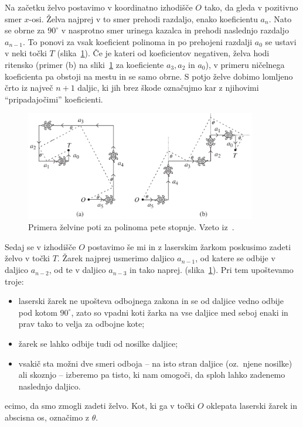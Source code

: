 Na začetku želvo postavimo v koordinatno izhodišče $O$ tako, da gleda v pozitivno smer $x$-osi. Želva najprej v to smer prehodi razdaljo, enako koeficientu $a_n$. Nato se obrne za $90^\circ$ v nasprotno smer urinega kazalca in prehodi naslednjo razdaljo $a_{n-1}$. To ponovi za vsak koeficient polinoma in po prehojeni razdalji $a_0$ se ustavi v neki točki $T$ (slika~\ref{fig:primera_zelve}). Če je kateri od koeficientov negativen, želva hodi ritensko (primer (b) na sliki~\ref{fig:primera_zelve} za koeficiente $a_3, a_2$ in $a_0$), v primeru ničelnega koeficienta pa obstoji na mestu in se samo obrne. S potjo želve dobimo lomljeno črto iz največ $n+1$ daljic, ki jih brez škode označujmo kar z njihovimi ``pripadajočimi'' koeficienti.

\begin{figure}[h]
    \centering
    \includegraphics[width=0.9\textwidth]{images/kubična enačba/primera_zelvine_poti.png}
    \caption[Primera želvine poti]{Primera želvine poti za polinoma pete stopnje. Vzeto iz~\cite[str.\ 311]{hull2011}.}
    \label{fig:primera_zelve}
\end{figure}

Sedaj se v izhodišče $O$ postavimo še mi in z laserskim žarkom poskusimo zadeti želvo v točki $T$. Žarek najprej usmerimo daljico $a_{n-1}$, od katere se odbije v daljico $a_{n-2}$, od te v daljico $a_{n-3}$ in tako naprej. (slika~\ref{fig:primera_zelve}). Pri tem upoštevamo troje:
\begin{itemize}
    \item laserski žarek ne upošteva odbojnega zakona in se od daljice vedno odbije pod kotom $90^\circ$, zato so vpadni koti žarka na vse daljice med seboj enaki in prav tako to velja za odbojne kote;
    \item žarek se lahko odbije tudi od nosilke daljice;
    \item vsakič sta možni dve smeri odboja -- na isto stran daljice (oz.\ njene nosilke) ali skoznjo -- izberemo pa tisto, ki nam omogoči, da sploh lahko zadenemo naslednjo daljico.
\end{itemize}
ecimo, da smo zmogli zadeti želvo. Kot, ki ga v točki $O$ oklepata laserski žarek in abscisna os, označimo z $\theta$.

